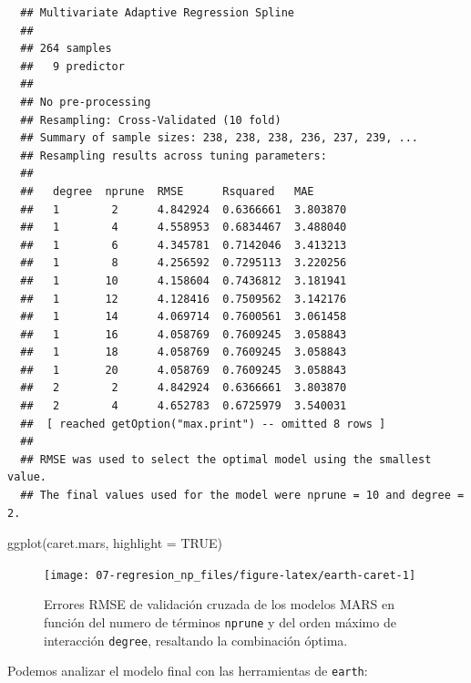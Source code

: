 \documentclass[
]{book}
\newenvironment{Shaded}{\begin{snugshade}}{\end{snugshade}}
\newcommand{\AttributeTok}[1]{\textcolor[rgb]{0.77,0.63,0.00}{#1}}
\newcommand{\ConstantTok}[1]{\textcolor[rgb]{0.00,0.00,0.00}{#1}}
\newcommand{\FunctionTok}[1]{\textcolor[rgb]{0.00,0.00,0.00}{#1}}
\newcommand{\NormalTok}[1]{#1}
\newcommand{\SpecialCharTok}[1]{\textcolor[rgb]{0.00,0.00,0.00}{#1}}
\theoremstyle{break}
\theoremstyle{nonumberplain}
\begin{document}
\begin{verbatim}
  ## Multivariate Adaptive Regression Spline 
  ## 
  ## 264 samples
  ##   9 predictor
  ## 
  ## No pre-processing
  ## Resampling: Cross-Validated (10 fold) 
  ## Summary of sample sizes: 238, 238, 238, 236, 237, 239, ... 
  ## Resampling results across tuning parameters:
  ## 
  ##   degree  nprune  RMSE      Rsquared   MAE     
  ##   1        2      4.842924  0.6366661  3.803870
  ##   1        4      4.558953  0.6834467  3.488040
  ##   1        6      4.345781  0.7142046  3.413213
  ##   1        8      4.256592  0.7295113  3.220256
  ##   1       10      4.158604  0.7436812  3.181941
  ##   1       12      4.128416  0.7509562  3.142176
  ##   1       14      4.069714  0.7600561  3.061458
  ##   1       16      4.058769  0.7609245  3.058843
  ##   1       18      4.058769  0.7609245  3.058843
  ##   1       20      4.058769  0.7609245  3.058843
  ##   2        2      4.842924  0.6366661  3.803870
  ##   2        4      4.652783  0.6725979  3.540031
  ##  [ reached getOption("max.print") -- omitted 8 rows ]
  ## 
  ## RMSE was used to select the optimal model using the smallest value.
  ## The final values used for the model were nprune = 10 and degree = 2.
\end{verbatim}

\begin{Shaded}
\begin{Highlighting}[]
\FunctionTok{ggplot}\NormalTok{(caret.mars, }\AttributeTok{highlight =} \ConstantTok{TRUE}\NormalTok{)}
\end{Highlighting}
\end{Shaded}

\begin{figure}[!htb]

{\centering \texttt{[image: 07-regresion\_np\_files/figure-latex/earth-caret-1]} 

}

\caption{Errores RMSE de validación cruzada de los modelos MARS en función del numero de términos \texttt{nprune} y del orden máximo de interacción \texttt{degree}, resaltando la combinación óptima.}\label{fig:earth-caret}
\end{figure}

Podemos analizar el modelo final con las herramientas de \texttt{earth}:

\begin{Shaded}
\end{Shaded}
\end{document}
